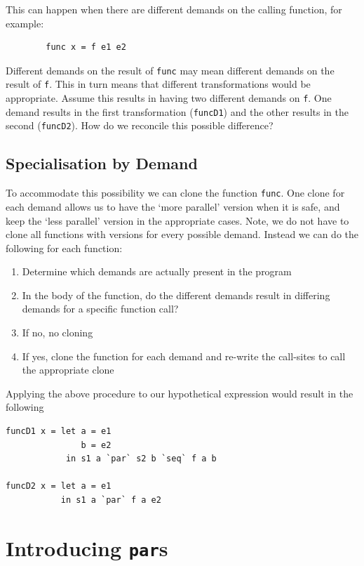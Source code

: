 This can happen when there are different demands on the calling function, for
example:

\begin{verbatim}
        func x = f e1 e2
\end{verbatim}

Different demands on the result of \verb`func` may mean different demands on
the result of \verb`f`. This in turn means that different transformations would
be appropriate. Assume this results in having two different demands on
\verb`f`. One demand results in the first transformation (\verb-funcD1-) and
the other results in the second (\verb-funcD2-). How do we reconcile this
possible difference?

\subsection*{Specialisation by Demand}

To accommodate this possibility we can clone the function \verb`func`. One
clone for each demand allows us to have the `more parallel' version when it
is safe, and keep the `less parallel' version in the appropriate cases. Note,
we do not have to clone all functions with versions for every possible demand.
Instead we can do the following for each function:

\begin{enumerate}
    \item Determine which demands are actually present in the program
    \item In the body of the function, do the different demands result in differing
        demands for a specific function call?
    \item If no, no cloning
    \item If yes, clone the function for each demand and re-write the call-sites to call
        the appropriate clone
\end{enumerate}

Applying the above procedure to our hypothetical expression would result in the
following


\begin{verbatim}
funcD1 x = let a = e1
               b = e2
            in s1 a `par` s2 b `seq` f a b

funcD2 x = let a = e1
           in s1 a `par` f a e2
\end{verbatim}


\section{Introducing \texttt{par}s}
\label{sec:introPar}

